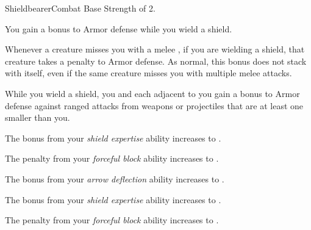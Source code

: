     \begin{feat}{Shieldbearer}{Combat}
        \featpre Base Strength of 2.

         You gain a  bonus to Armor defense while you wield a shield.

         Whenever a creature misses you with a melee , if you are wielding a shield, that creature  takes a  penalty to Armor defense.
        As normal, this bonus does not stack with itself, even if the same creature misses you with multiple melee attacks.

         While you wield a shield, you and each  adjacent to you gain a  bonus to Armor defense against  ranged attacks from weapons or projectiles that are at least one  smaller than you.

         The bonus from your \textit{shield expertise} ability increases to .

         The penalty from your \textit{forceful block} ability increases to .

         The bonus from your \textit{arrow deflection} ability increases to .

         The bonus from your \textit{shield expertise} ability increases to .

         The penalty from your \textit{forceful block} ability increases to .
    \end{feat}

